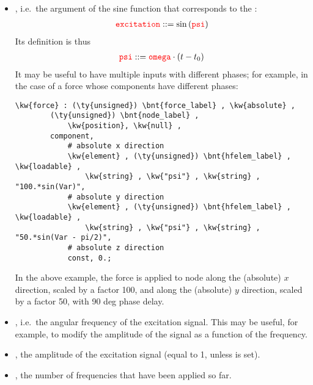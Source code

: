 \begin{itemize}
\item {}, i.e.\ the argument of the sine function that corresponds to the :
\begin{align}
	\textcolor{red}{\texttt{excitation}} ::= \sin\left( \textcolor{red}{\texttt{psi}} \right)
\end{align}
Its definition is thus
\begin{align}
	\textcolor{red}{\texttt{psi}} ::= \textcolor{red}{\texttt{omega}} \cdot (t - t_0)
\end{align}
It may be useful to have multiple inputs with different phases; for example, in the case of a force whose components have different phases:
\begin{Verbatim}[commandchars=\\\{\}]
    \kw{force} : (\ty{unsigned}) \bnt{force_label} , \kw{absolute} ,
        (\ty{unsigned}) \bnt{node_label} ,
            \kw{position}, \kw{null} ,
        component,
            # absolute x direction
            \kw{element} , (\ty{unsigned}) \bnt{hfelem_label} , \kw{loadable} ,
                \kw{string} , \kw{"psi"} , \kw{string} , "100.*sin(Var)",
            # absolute y direction
            \kw{element} , (\ty{unsigned}) \bnt{hfelem_label} , \kw{loadable} ,
                \kw{string} , \kw{"psi"} , \kw{string} , "50.*sin(Var - pi/2)",
            # absolute z direction
            const, 0.;
\end{Verbatim}
In the above example, the force is applied to node 
along the (absolute) $x$ direction, scaled by a factor 100, and
along the (absolute) $y$ direction, scaled by a factor 50, with 90 deg phase delay.

\item {}, i.e.\ the angular frequency of the excitation signal.
This may be useful, for example, to modify the amplitude of the signal as a function of the frequency.

\item {}, the amplitude of the excitation signal (equal to 1, unless  is set).

\item {}, the number of frequencies that have been applied so far.

\end{itemize}

